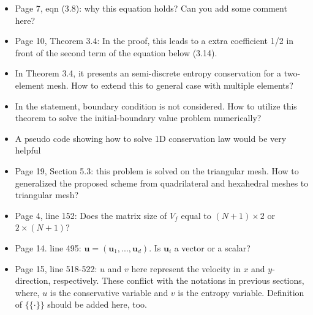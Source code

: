 \documentclass{article}
\newcommand{\note}[1]{{\color{blue}{#1}}}
\begin{document}
\begin{itemize}
\item Page 7, eqn (3.8): why this equation holds? Can you add some comment here?

\note{Certainly.  We've added a continuous description of the equation, and have interpreted it as a quadrature approximation of a specific variational problem.}

\item Page 10, Theorem 3.4: In the proof, this leads to a extra coefficient 1/2 in front of the second term of the equation below (3.14).
\item In Theorem 3.4, it presents an semi-discrete entropy conservation for a two-element mesh. How to extend this to general case with multiple elements?
\item In the statement, boundary condition is not considered. How to utilize this theorem to solve the initial-boundary value problem numerically?
\item A pseudo code showing how to solve 1D conservation law would be very helpful
\item Page 19, Section 5.3: this problem is solved on the triangular mesh. How to generalized the proposed scheme from quadrilateral and hexahedral meshes to triangular mesh?
\item Page 4, line 152: Does the matrix size of $V_f$ equal to $(N+1) \times 2$ or $2 \times (N+1)$?
\item Page 14. line 495: $\bm{u} = (\bm{u}_1, . . . , \bm{u}_d)$. Is $\bm{u}_i$ a vector or a scalar?  
\item Page 15, line 518-522: $u$ and $v$ here represent the velocity in $x$ and $y$-direction, respectively. These conflict with the notations in previous sections, where, $u$ is the conservative variable and $v$ is the entropy variable. Definition of $\{\{\cdot\}\}$ should be added here, too.
\end{itemize}
\end{document}
